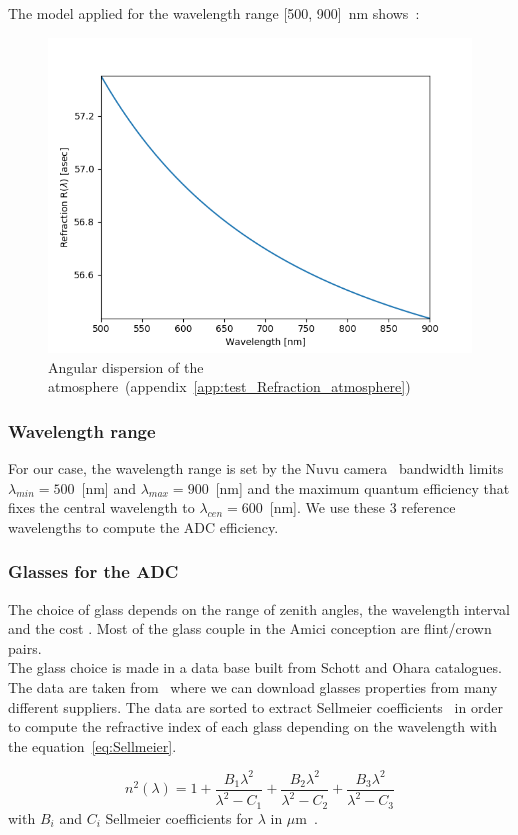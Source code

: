 The model applied for the wavelength range [500, 900]~nm shows~:
\begin{figure}[H]
\centering
	\includegraphics[width = .7\textwidth]{images/refraction_atm.png}
	\caption{Angular dispersion of the atmosphere~(appendix~\ref{app:test_Refraction_atmosphere})}\label{fig:refraction_atm}
	\centering
\end{figure}

\subsubsection{Wavelength range}
For our case, the wavelength range is set by the Nuvu camera~\cite{NuvuQE} bandwidth limits $\lambda_{min} = 500$~[nm] and $\lambda_{max} = 900$~[nm] and the maximum quantum efficiency that fixes the central wavelength to $\lambda_{cen} = 600$~[nm]. We use these 3 reference wavelengths to compute the ADC efficiency.

\subsubsection{Glasses for the ADC}
The choice of glass depends on the range of zenith angles, the wavelength interval and the cost \cite{WynneWors1986}. Most of the glass couple in the Amici conception are flint/crown pairs. \\
The glass choice is made in a data base built from Schott and Ohara catalogues. The data are taken from~\cite{RefIndexInfo} where we can download glasses properties from many different suppliers. The data are sorted to extract Sellmeier coefficients~\cite{SchottSellmeier} in order to compute the refractive index of each glass depending on the wavelength with the equation~\eqref{eq:Sellmeier}.

\begin{equation}
	n^2(\lambda) = 1+ \frac{B_1\lambda^2}{\lambda^2-C_1}+\frac{B_2\lambda^2}{\lambda^2-C_2}+\frac{B_3\lambda^2}{\lambda^2-C_3}\label{eq:Sellmeier}
\end{equation}
with $B_i$ and $C_i$ Sellmeier coefficients for $\lambda$ in $\mu$m~\cite{SchottSellmeier}.\\



